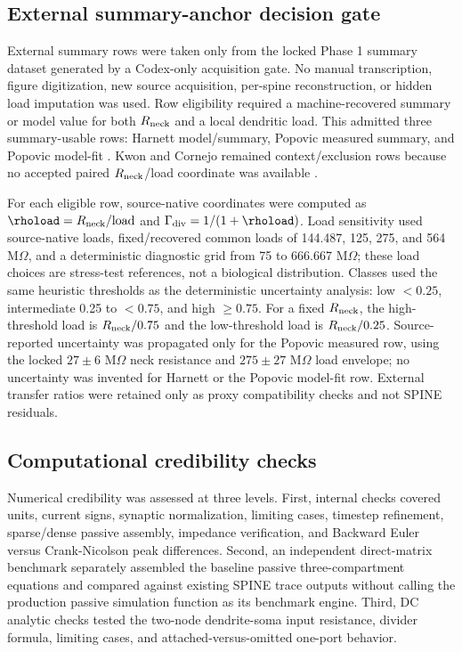 \subsection{External summary-anchor decision gate}

External summary rows were taken only from the locked Phase 1 summary dataset generated by a Codex-only acquisition gate. No manual transcription, figure digitization, new source acquisition, per-spine reconstruction, or hidden load imputation was used. Row eligibility required a machine-recovered summary or model value for both $R_{\mathrm{neck}}$ and a local dendritic load. This admitted three summary-usable rows: Harnett model/summary, Popovic measured summary, and Popovic model-fit \citep{Harnett2012SpineAmplification,Popovic2015}. Kwon and Cornejo remained context/exclusion rows because no accepted paired $R_{\mathrm{neck}}$/load coordinate was available \citep{Kwon2017,Cornejo2022}.

For each eligible row, source-native coordinates were computed as $\rhoload=\Rneck/\mathrm{load}$ and $\Gamma_{\mathrm{div}}=1/(1+\rhoload)$. Load sensitivity used source-native loads, fixed/recovered common loads of 144.487, 125, 275, and 564 M$\Omega$, and a deterministic diagnostic grid from 75 to 666.667 M$\Omega$; these load choices are stress-test references, not a biological distribution. Classes used the same heuristic thresholds as the deterministic uncertainty analysis: low $<0.25$, intermediate 0.25 to $<0.75$, and high $\geq0.75$. For a fixed $R_{\mathrm{neck}}$, the high-threshold load is $R_{\mathrm{neck}}/0.75$ and the low-threshold load is $R_{\mathrm{neck}}/0.25$. Source-reported uncertainty was propagated only for the Popovic measured row, using the locked $27\pm6$ M$\Omega$ neck resistance and $275\pm27$ M$\Omega$ load envelope; no uncertainty was invented for Harnett or the Popovic model-fit row. External transfer ratios were retained only as proxy compatibility checks and not SPINE residuals.

\subsection{Computational credibility checks}

Numerical credibility was assessed at three levels. First, internal checks covered units, current signs, synaptic normalization, limiting cases, timestep refinement, sparse/dense passive assembly, impedance verification, and Backward Euler versus Crank-Nicolson peak differences. Second, an independent direct-matrix benchmark separately assembled the baseline passive three-compartment equations and compared against existing SPINE trace outputs without calling the production passive simulation function as its benchmark engine. Third, DC analytic checks tested the two-node dendrite-soma input resistance, divider formula, limiting cases, and attached-versus-omitted one-port behavior.

